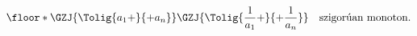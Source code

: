 $$
\floor*{\GZJ{ \Tolig{a_{1}+}{+a_{n}}}\GZJ{ \Tolig{\frac{1}{a_{1}}+}{+\frac{1}{a_{n}}}}}
\text{\ \ \ szigorúan monoton.}
$$

